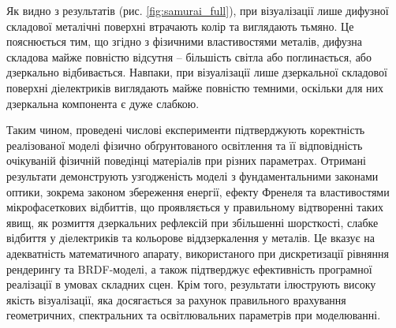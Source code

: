 \par Як видно з результатів (рис. \ref{fig:samurai_full}), при візуалізації лише дифузної складової металічні поверхні втрачають колір та виглядають тьмяно. Це пояснюється тим, що згідно з фізичними властивостями металів, дифузна складова майже повністю відсутня -- більшість світла або поглинається, або дзеркально відбивається. Навпаки, при візуалізації лише дзеркальної складової поверхні ді\-елект\-ри\-ків виглядають майже повністю темними, оскільки для них дзеркальна компонента є дуже слабкою.

\par Таким чином, проведені числові експерименти підтверджують коректність реалізованої моделі фізично обґрунтованого освітлення та її відповідність очікуваній фізичній поведінці матеріалів при різних параметрах. Отримані результати демонструють узгодженість моделі з фундаментальними законами оптики, зокрема законом збереження енергії, ефекту Френеля та властивостями мікрофасеткових відбиттів, що проявляється у правильному відтворенні таких явищ, як розмиття дзеркальних рефлексій при збільшенні шорсткості, слабке відбиття у діелектриків та кольорове віддзеркалення у металів. Це вказує на адекватність математичного апарату, використаного при дискретизації рівняння рендерингу та BRDF-моделі, а також підтверджує ефективність програмної реалізації в умовах складних сцен. Крім того, результати ілюструють високу якість візуалізації, яка досягається за рахунок правильного врахування геометричних, спектральних та освітлювальних параметрів при моделюванні.
